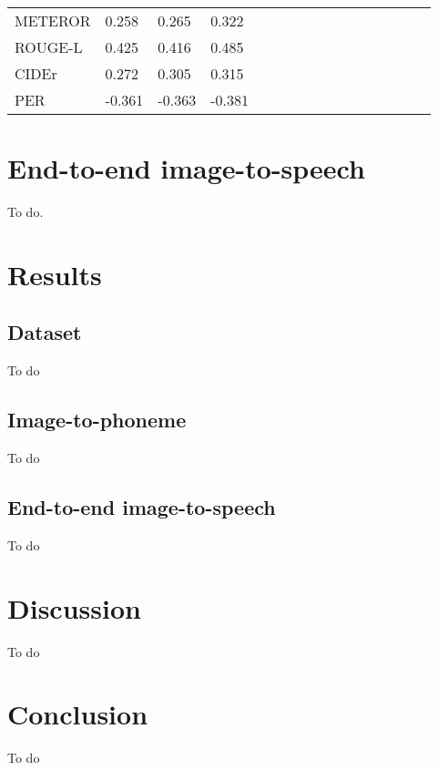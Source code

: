 \documentclass[journal,comsoc]{IEEEtran}
\begin{document}
\begin{table*}[]
\begin{tabular}{l|lll|lll|lll|lll|lll}
METEROR &  0.258      & 0.265        &  0.322       &        &         &        &        &         &        &        &         &        &        &         &        \\
ROUGE-L &  0.425      & 0.416        &  0.485       &        &         &        &        &         &        &        &         &        &        &         &        \\
CIDEr   &  0.272      & 0.305        &  0.315       &        &         &        &        &         &        &        &         &        &        &         &        \\
PER     &  -0.361      &    -0.363     &    -0.381     &        &         &        &        &         &        &        &         &        &        &         &        \\ \hline
\end{tabular}
\end{table*}





\section{End-to-end image-to-speech}
\label{sc:End2end model}
To do.

\section{Results}
\label{sc:results}
\subsection{Dataset}
To do
\subsection{Image-to-phoneme}
To do


\subsection{End-to-end image-to-speech}
To do





\section{Discussion}
\label{sc:discussion}
To do

\section{Conclusion}
\label{sc:conclusion}
To do
\end{document}
